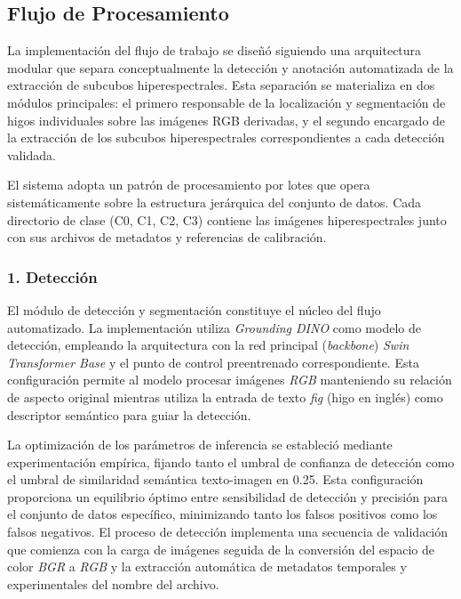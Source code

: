 \subsection{Flujo de Procesamiento}

La implementación del flujo de trabajo se diseñó siguiendo una arquitectura modular que separa conceptualmente la detección y anotación automatizada de la extracción de subcubos hiperespectrales. Esta separación se materializa en dos módulos principales: el primero responsable de la localización y segmentación de higos individuales sobre las imágenes RGB derivadas, y el segundo encargado de la extracción de los subcubos hiperespectrales correspondientes a cada detección validada.

\vspace{5mm}

El sistema adopta un patrón de procesamiento por lotes que opera sistemáticamente sobre la estructura jerárquica del conjunto de datos. Cada directorio de clase (C0, C1, C2, C3) contiene las imágenes hiperespectrales junto con sus archivos de metadatos y referencias de calibración.

\subsubsection{1. Detección}

El módulo de detección y segmentación constituye el núcleo del flujo automatizado. La implementación utiliza \emph{Grounding DINO} como modelo de detección, empleando la arquitectura con la red principal (\emph{backbone}) \emph{Swin Transformer Base} y el punto de control preentrenado correspondiente. Esta configuración permite al modelo procesar imágenes \emph{RGB} manteniendo su relación de aspecto original mientras utiliza la entrada de  texto \emph{fig} (higo en inglés) como descriptor semántico para guiar la detección.

\vspace{5mm}

La optimización de los parámetros de inferencia se estableció mediante experimentación empírica, fijando tanto el umbral de confianza de detección como el umbral de similaridad semántica texto-imagen en 0.25. Esta configuración proporciona un equilibrio óptimo entre sensibilidad de detección y precisión para el conjunto de datos específico, minimizando tanto los falsos positivos como los falsos negativos. El proceso de detección implementa una secuencia de validación que comienza con la carga de imágenes seguida de la conversión del espacio de color \emph{BGR} a \emph{RGB} y la extracción automática de metadatos temporales y experimentales del nombre del archivo.

